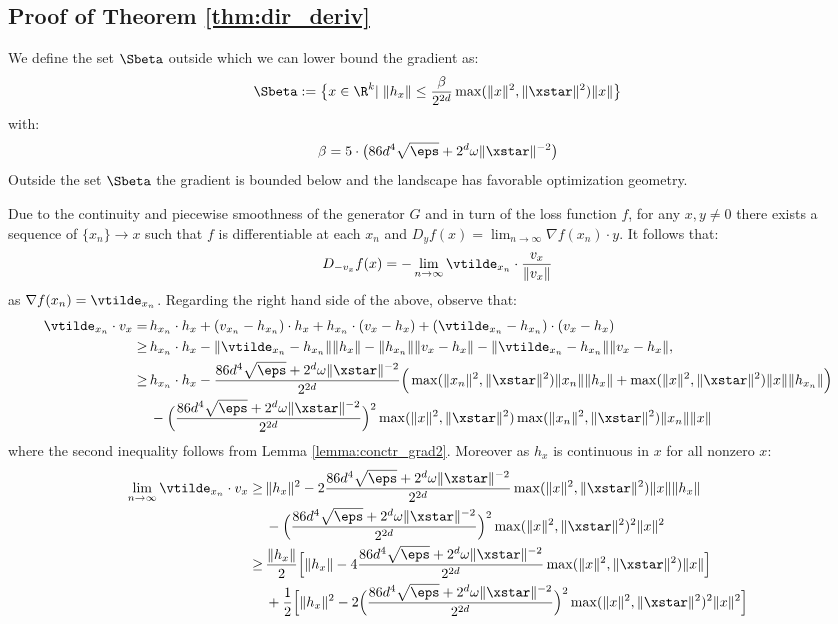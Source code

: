\subsection{Proof of Theorem \ref{thm:dir_deriv}}\label{sec:proof_det}

We define the set $\Sbeta$ outside which we can lower bound the gradient as:
\[
\Sbeta := \big\{ x \in \R^k |\;  \|h_x\| \leq \frac{\beta}{2^{2d}}  \max(\|x\|^2, \|\xstar\|^2) \|x\|  \big\}
\]
with:
\begin{equation}\label{eq:beta_def}
\beta = 5 \cdot \big(86 d^4 \sqrt{\eps} + 2^d \omega \|\xstar\|^{-2} \big)
\end{equation}
Outside the set $\Sbeta$ the gradient is bounded below and the landscape has
favorable optimization geometry. 

\noindent Due to the continuity and piecewise smoothness of the generator $G$ and in turn of the loss function $f$, for any $x,y \neq 0$ there exists a sequence of $\{x_n\} \to x$ such that $f$ is differentiable at each $x_n$ and $D_y f(x) = \lim_{n \to \infty} \nabla f(x_n) \cdot y$. It follows that:
\[
D_{- v_x} f(x) = - \lim_{n \to \infty} \vtilde_{x_n} \cdot \frac{v_x}{\|v_x\|}
\]
as $\nabla f(x_n) = \vtilde_{x_n}$.
Regarding the right hand side of the above, observe that: 
\[
\begin{aligned}
\vtilde_{x_n} \cdot v_x = \,&h_{x_n} \cdot h_x + (v_{x_n} - h_{x_n}) \cdot h_x 
+ h_{x_{n}} \cdot (v_x - h_x) + (\vtilde_{x_n} - h_{x_{n}}) \cdot (v_x - h_x)\\
\geq \,&h_{x_n} \cdot h_{x} - \|\vtilde_{x_n} - h_{x_n}\| \|h_x\| - \|h_{x_n}\| \| v_x - h_x\|
- \| \vtilde_{x_n} - h_{x_n}\| \| v_x - h_x\|,\\
\geq \,&h_{x_n} \cdot h_x 
- \frac{86 d^4 \sqrt{\eps}  + 2^d \omega \|\xstar\|^{-2}}{2^{2d}} \Big( \max(\|x_n\|^2, \|\xstar\|^2) \|x_n\| \|h_{x}\|
+ \max(\|x\|^2, \|\xstar\|^2) \|x\| \|h_{x_n}\| \Big)
\\ \,&- \Big(\frac{86 d^4 \sqrt{\eps} + 2^d \omega \|\xstar\|^{-2}}{2^{2d}}\Big)^2 \max(\|x\|^2, \|\xstar\|^2) \max(\|x_n\|^2, \|\xstar\|^2) \| x_n\| \|x\|
\end{aligned}	
\]
where the second inequality follows from Lemma \ref{lemma:conctr_grad2}. Moreover as $h_x$ is continuous in $x$ for all nonzero $x$:
\[
\begin{aligned}
\lim_{n \to \infty} \vtilde_{x_n} \cdot v_x 
\geq \,& \| h_x \|^2 
- 2 \frac{86 d^4 \sqrt{\eps}  + 2^d \omega \|\xstar\|^{-2}}{2^{2d}}  \max(\|x\|^2, \|\xstar\|^2) \|x\| \|h_{x}\|  \\
\;\;&- \Big(\frac{86 d^4 \sqrt{\eps} + 2^d \omega \|\xstar\|^{-2}}{2^{2d}}\Big)^2 \max(\|x\|^2, \|\xstar\|^2)^2  \|x\|^2 \\
\geq \,& \frac{\|h_x\|}{2} \Big[ \|h_x\| - 4  \frac{86 d^4 \sqrt{\eps}  + 2^d \omega \|\xstar\|^{-2}}{2^{2d}}  \max(\|x\|^2, \|\xstar\|^2) \|x\|  \Big] \\
\,&+ \frac{1}{2} \Big[ \|h_x\|^2 - 2 \Big(\frac{86 d^4 \sqrt{\eps} + 2^d \omega \|\xstar\|^{-2}}{2^{2d}}\Big)^2 \max(\|x\|^2, \|\xstar\|^2)^2  \|x\|^2  \Big]
\end{aligned}
\]
